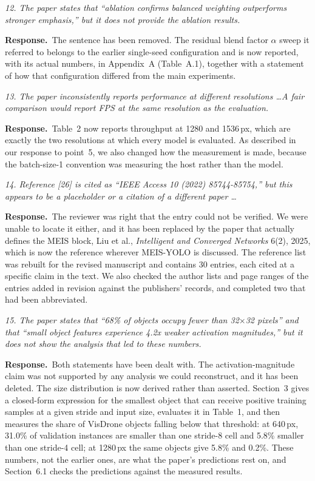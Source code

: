 \documentclass[11pt, a4paper]{article}
\newcommand{\point}[1]{\medskip\noindent\textit{#1}\par}
\newcommand{\reply}{\textbf{Response.}\ }
\begin{document}
\point{12. The paper states that ``ablation confirms balanced weighting
outperforms stronger emphasis,'' but it does not provide the ablation results.}

\reply The sentence has been removed. The residual blend factor $\alpha$ sweep it
referred to belongs to the earlier single-seed configuration and is now reported,
with its actual numbers, in Appendix~A (Table~A.1), together with a statement of
how that configuration differed from the main experiments.

\point{13. The paper inconsistently reports performance at different resolutions
\dots A fair comparison would report FPS at the same resolution as the evaluation.}

\reply Table~2 now reports throughput at 1280 and 1536\,px, which are exactly the
two resolutions at which every model is evaluated. As described in our response to
point~5, we also changed how the measurement is made, because the batch-size-1
convention was measuring the host rather than the model.

\point{14. Reference [26] is cited as ``IEEE Access 10 (2022) 85744-85754,'' but
this appears to be a placeholder or a citation of a different paper \dots}

\reply The reviewer was right that the entry could not be verified. We were unable
to locate it either, and it has been replaced by the paper that actually defines
the MEIS block, Liu et al., \textit{Intelligent and Converged Networks} 6(2),
2025, which is now the reference wherever MEIS-YOLO is discussed. The reference
list was rebuilt for the revised manuscript and contains 30 entries, each cited at
a specific claim in the text. We also checked the author lists and page ranges of
the entries added in revision against the publishers' records, and completed two
that had been abbreviated.

\point{15. The paper states that ``68\% of objects occupy fewer than
32$\times$32 pixels'' and that ``small object features experience 4.2x weaker
activation magnitudes,'' but it does not show the analysis that led to these
numbers.}

\reply Both statements have been dealt with. The activation-magnitude claim was
not supported by any analysis we could reconstruct, and it has been deleted.
The size distribution is now derived rather than asserted. Section~3 gives a
closed-form expression for the smallest object that can receive positive training
samples at a given stride and input size, evaluates it in Table~1, and then
measures the share of VisDrone objects falling below that threshold: at 640\,px,
31.0\% of validation instances are smaller than one stride-8 cell and 5.8\%
smaller than one stride-4 cell; at 1280\,px the same objects give 5.8\% and
0.2\%. These numbers, not the earlier ones, are what the paper's predictions rest
on, and Section~6.1 checks the predictions against the measured results.
\end{document}
